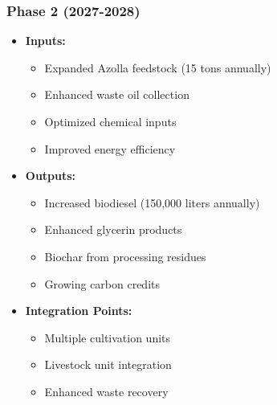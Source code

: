 \subsubsection{Phase 2 (2027-2028)}
\begin{itemize}
    \item \textbf{Inputs:}
    \begin{itemize}
        \item Expanded Azolla feedstock (15 tons annually)
        \item Enhanced waste oil collection
        \item Optimized chemical inputs
        \item Improved energy efficiency
    \end{itemize}
    \item \textbf{Outputs:}
    \begin{itemize}
        \item Increased biodiesel (150,000 liters annually)
        \item Enhanced glycerin products
        \item Biochar from processing residues
        \item Growing carbon credits
    \end{itemize}
    \item \textbf{Integration Points:}
    \begin{itemize}
        \item Multiple cultivation units
        \item Livestock unit integration
        \item Enhanced waste recovery
    \end{itemize}
\end{itemize}

